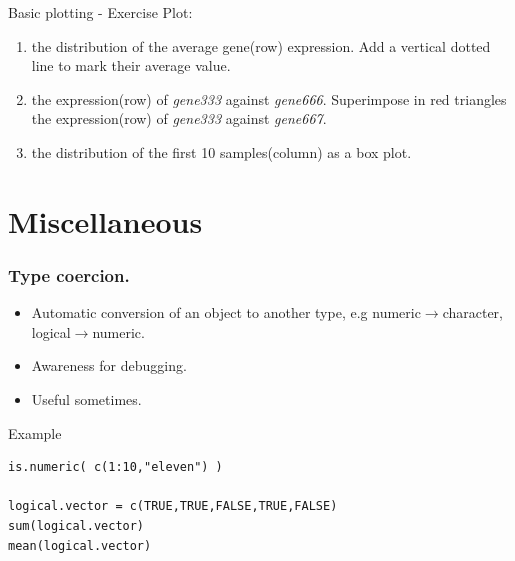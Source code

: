 \documentclass[10pt]{beamer}
\newenvironment{xframe}[2][]
  {\begin{frame}[fragile,environment=xframe,#1]
  \frametitle{#2}}
  {\end{frame}}
\begin{document}


\begin{frame}{Basic plotting - Exercise}
  Plot:
  \begin{enumerate}
  \item the distribution of the average gene(row) expression. Add a vertical dotted line to mark their average value.
  \item the expression(row) of {\it gene333} against {\it gene666}. Superimpose in red triangles the expression(row) of {\it gene333} against {\it gene667}.
  \item the distribution of the first 10 samples(column) as a box plot.
  \end{enumerate}
\end{frame}



\section{Miscellaneous}

\begin{xframe}{Type coercion.}
  \begin{block}{}
    \begin{itemize}
    \item Automatic conversion of an object to another type, e.g {\sf numeric}$\rightarrow${\sf character}, {\sf logical}$\rightarrow${\sf numeric}.
    \item Awareness for debugging.
    \item Useful sometimes.
    \end{itemize}
  \end{block}
  \begin{exampleblock}{Example}
\begin{verbatim}
is.numeric( c(1:10,"eleven") )

logical.vector = c(TRUE,TRUE,FALSE,TRUE,FALSE)
sum(logical.vector)
mean(logical.vector)
\end{verbatim}  
  \end{exampleblock}
\end{xframe}

\end{document}

